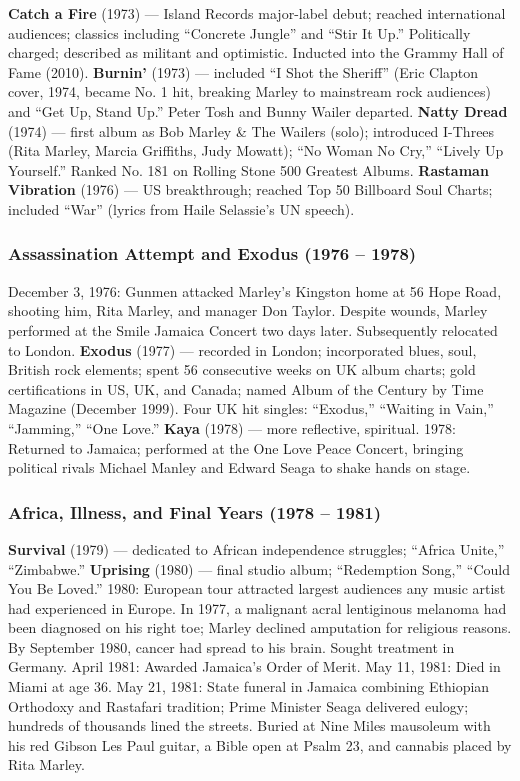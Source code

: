 \documentclass[11pt,letterpaper]{article}
\begin{document}
\textbf{Catch a Fire} (1973) --- Island Records major-label debut; reached international audiences; classics including ``Concrete Jungle'' and ``Stir It Up.'' Politically charged; described as militant and optimistic. Inducted into the Grammy Hall of Fame (2010). \textbf{Burnin'} (1973) --- included ``I Shot the Sheriff'' (Eric Clapton cover, 1974, became No. 1 hit, breaking Marley to mainstream rock audiences) and ``Get Up, Stand Up.'' Peter Tosh and Bunny Wailer departed. \textbf{Natty Dread} (1974) --- first album as Bob Marley \& The Wailers (solo); introduced I-Threes (Rita Marley, Marcia Griffiths, Judy Mowatt); ``No Woman No Cry,'' ``Lively Up Yourself.'' Ranked No. 181 on Rolling Stone 500 Greatest Albums. \textbf{Rastaman Vibration} (1976) --- US breakthrough; reached Top 50 Billboard Soul Charts; included ``War'' (lyrics from Haile Selassie's UN speech).

\subsubsection{Assassination Attempt and Exodus (1976 -- 1978)}

December 3, 1976: Gunmen attacked Marley's Kingston home at 56 Hope Road, shooting him, Rita Marley, and manager Don Taylor. Despite wounds, Marley performed at the Smile Jamaica Concert two days later. Subsequently relocated to London. \textbf{Exodus} (1977) --- recorded in London; incorporated blues, soul, British rock elements; spent 56 consecutive weeks on UK album charts; gold certifications in US, UK, and Canada; named Album of the Century by Time Magazine (December 1999). Four UK hit singles: ``Exodus,'' ``Waiting in Vain,'' ``Jamming,'' ``One Love.'' \textbf{Kaya} (1978) --- more reflective, spiritual. 1978: Returned to Jamaica; performed at the One Love Peace Concert, bringing political rivals Michael Manley and Edward Seaga to shake hands on stage.

\subsubsection{Africa, Illness, and Final Years (1978 -- 1981)}

\textbf{Survival} (1979) --- dedicated to African independence struggles; ``Africa Unite,'' ``Zimbabwe.'' \textbf{Uprising} (1980) --- final studio album; ``Redemption Song,'' ``Could You Be Loved.'' 1980: European tour attracted largest audiences any music artist had experienced in Europe. In 1977, a malignant acral lentiginous melanoma had been diagnosed on his right toe; Marley declined amputation for religious reasons. By September 1980, cancer had spread to his brain. Sought treatment in Germany. April 1981: Awarded Jamaica's Order of Merit. May 11, 1981: Died in Miami at age 36. May 21, 1981: State funeral in Jamaica combining Ethiopian Orthodoxy and Rastafari tradition; Prime Minister Seaga delivered eulogy; hundreds of thousands lined the streets. Buried at Nine Miles mausoleum with his red Gibson Les Paul guitar, a Bible open at Psalm 23, and cannabis placed by Rita Marley.
\end{document}
